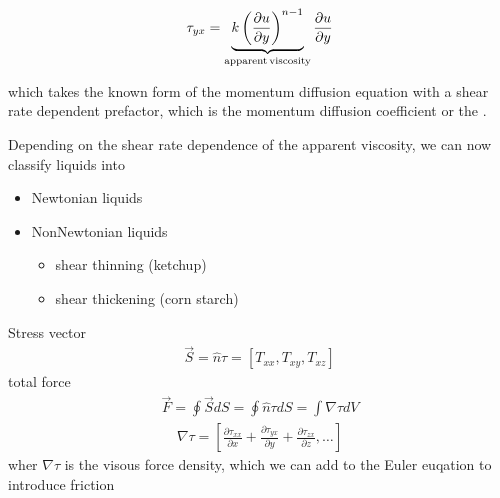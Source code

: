 \documentclass[letterpaper,10pt,english]{sphinxmanual}
\let\sphinxpxdimen\pdfpxdimen\else\newdimen\sphinxpxdimen
\begin{document}
\sphinxAtStartPar
\begin{equation}
\tau_{yx}=\underbrace{k\left( \frac{\partial u}{\partial y} \right)^{n-1} }_{\rm apparent\, viscosity} \frac{\partial u}{\partial y}
\end{equation}

\sphinxAtStartPar
which takes the known form of the momentum diffusion equation with a shear rate dependent prefactor, which is the momentum diffusion coefficient or the .

\sphinxAtStartPar
Depending on the shear rate dependence of the apparent viscosity, we can now classify liquids into
\begin{itemize}
\item {} 
\sphinxAtStartPar
Newtonian liquids

\item {} 
\sphinxAtStartPar
Non\sphinxhyphen{}Newtonian liquids
\begin{itemize}
\item {} 
\sphinxAtStartPar
shear thinning (ketchup)

\item {} 
\sphinxAtStartPar
shear thickening (corn starch)

\end{itemize}

\end{itemize}

\noindent\sphinxincludegraphics[width=533\sphinxpxdimen,height=512\sphinxpxdimen]{{nonnewton}.png}

\sphinxAtStartPar
Stress vector
\begin{equation*}
\begin{split}\vec{S}=\hat{n} \tau =[T_{xx},T_{xy},T_{xz}]\end{split}
\end{equation*}
\sphinxAtStartPar
total force
\begin{equation*}
\begin{split}\vec{F}=\oint \vec{S} dS=\oint \hat{n}\tau dS=\int \nabla \tau dV\end{split}
\end{equation*}\begin{equation*}
\begin{split}\nabla \tau=\left [\frac{\partial \tau_{xx}}{\partial x} + \frac{\partial \tau_{yx}}{\partial y}+\frac{\partial \tau_{zx}}{\partial z},\ldots \right ]\end{split}
\end{equation*}
\sphinxAtStartPar
wher \(\nabla \tau\) is the visous force density, which we can add to the Euler euqation to introduce friction
\end{document}
